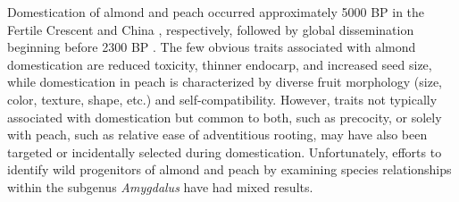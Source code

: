 \documentclass[12pt]{article}
\begin{document}

Domestication of almond and peach occurred approximately 5000 BP in the Fertile Crescent and China \citep{zohary2012domestication}, respectively, followed by global dissemination beginning before 2300 BP \citep{hedrick1917peaches, edwards1975almond, gradziel2011origin, zheng2014archaeological}. 
%
%
The few obvious traits associated with almond domestication are reduced toxicity, thinner endocarp, and increased seed size, while domestication in peach is characterized by diverse fruit morphology (size, color, texture, shape, etc.) and self-compatibility.
%
However, traits not typically associated with domestication but common to both, such as precocity, or solely with peach, such as relative ease of adventitious rooting, may have also been targeted or incidentally selected during domestication. 
%
Unfortunately, efforts to identify wild progenitors of almond and peach \citep{verde2013high, aradhya2004molecular, zeinalabedini2010origin, mowrey1990isozyme, browicz1996genus, ladizinsky1999origin, bassi20081} by examining species relationships within the subgenus \emph{Amygdalus} have had mixed results. 
\end{document}
